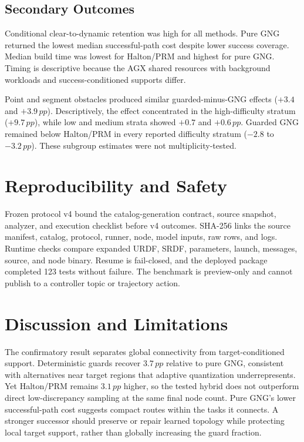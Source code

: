 \documentclass[letterpaper,10pt,conference]{ieeeconf}
\newcommand{\pp}{\,pp}
\begin{document}
\subsection{Secondary Outcomes}
Conditional clear-to-dynamic retention was high for all methods. Pure GNG returned the lowest median successful-path cost despite lower success coverage. Median build time was lowest for Halton/PRM and highest for pure GNG. Timing is descriptive because the AGX shared resources with background workloads and success-conditioned supports differ.

Point and segment obstacles produced similar guarded-minus-GNG effects ($+3.4$ and $+3.9\pp$). Descriptively, the effect concentrated in the high-difficulty stratum ($+9.7\pp$), while low and medium strata showed $+0.7$ and $+0.6\pp$. Guarded GNG remained below Halton/PRM in every reported difficulty stratum ($-2.8$ to $-3.2\pp$). These subgroup estimates were not multiplicity-tested.

\section{Reproducibility and Safety}
Frozen protocol v4 bound the catalog-generation contract, source snapshot, analyzer, and execution checklist before v4 outcomes. SHA-256 links the source manifest, catalog, protocol, runner, node, model inputs, raw rows, and logs. Runtime checks compare expanded URDF, SRDF, parameters, launch, messages, source, and node binary. Resume is fail-closed, and the deployed package completed 123 tests without failure. The benchmark is preview-only and cannot publish to a controller topic or trajectory action.

\section{Discussion and Limitations}
The confirmatory result separates global connectivity from target-conditioned support. Deterministic guards recover $3.7\pp$ relative to pure GNG, consistent with alternatives near target regions that adaptive quantization underrepresents. Yet Halton/PRM remains $3.1\pp$ higher, so the tested hybrid does not outperform direct low-discrepancy sampling at the same final node count. Pure GNG's lower successful-path cost suggests compact routes within the tasks it connects. A stronger successor should preserve or repair learned topology while protecting local target support, rather than globally increasing the guard fraction.
\end{document}
